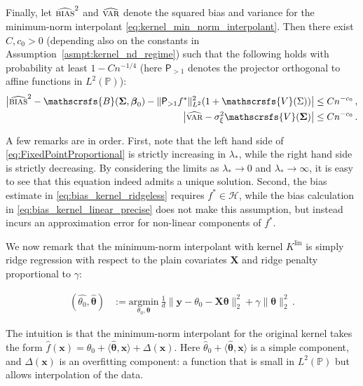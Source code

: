 \begin{theorem}
        Finally, let ${\widehat{\textsc{bias}}^2}$ and  ${\widehat{\textsc{var}}}$ denote the squared bias and variance for the minimum-norm interpolant \eqref{eq:kernel_min_norm_interpolant}. 
	Then there exist  $C,c_0>0$  (depending also on the constants in Assumption~\ref{asmpt:kernel_nd_regime})
        such that the following holds with probability at least $1-Cn^{-1/4}$ (here ${\mathsf P}_{>1}$ denotes the projector orthogonal to affine functions in $L^2(\mathbb{P})$):
	\begin{align}
          \big|{\widehat{\textsc{bias}}^2} -
          \mathscrsfs{B}({\boldsymbol \Sigma},{\boldsymbol \beta}_0)-\|{\mathsf P}_{>1}f^*\|_{L^2}^2
           (1+\mathscrsfs{V}(\Sigma)) \big|&\le C n^{-c_0}\, , \label{eq:bias_kernel_linear_precise}\\
           \big|	{\widehat{\textsc{var}}}-  \sigma_{\xi}^2\mathscrsfs{V}({\boldsymbol \Sigma}) \big|&\le C n^{-c_0}\, .\label{eq:var_kernel_linear_precise}
	\end{align}
      \end{theorem}

A few remarks are in order. First, note that the left hand side of \eqref{eq:FixedPointProportional} is strictly increasing in $\lambda_*$, while the right hand side is strictly decreasing. By considering the limits as $\lambda_*\to 0$ and $\lambda_*\to\infty$, it is easy to see that this equation indeed admits a unique solution. Second, the bias estimate in \eqref{eq:bias_kernel_ridgeless} requires
$f^*\in{\mathcal H}$, while the bias calculation in
\eqref{eq:bias_kernel_linear_precise} does not make this assumption, but instead incurs an approximation error for non-linear components of $f^*$. 

We now remark that the minimum-norm interpolant with kernel $K^{\text{lin}}$ is simply ridge regression with respect to the plain covariates ${\boldsymbol X}$ and ridge penalty proportional to $\gamma$:

\begin{align}
  (\widehat{\theta_0},\widehat{{\boldsymbol \theta}}) &:=\underset{\theta_0,{\boldsymbol \theta}}{\mathrm{argmin}} \ 
  \frac{1}{d}\big\|{\boldsymbol y}-\theta_0-{\boldsymbol X}{\boldsymbol \theta}\big\|_2^2+\gamma \|{\boldsymbol \theta}\|^2_2 \, .\label{eq:VanillaRidge}
\end{align}

The intuition is that the minimum-norm interpolant for the original kernel takes the form $\widehat{f}({\boldsymbol x})  = \widehat{\theta}_0+\langle\widehat{{\boldsymbol \theta}},{\boldsymbol x}\rangle +\Delta({\boldsymbol x})$. Here $\widehat{\theta}_0+\langle\widehat{{\boldsymbol \theta}},{\boldsymbol x}\rangle$ is a simple component, and $\Delta({\boldsymbol x})$ is an overfitting component: a function that is small in $L^2(\mathbb{P})$ but allows interpolation of the data.

